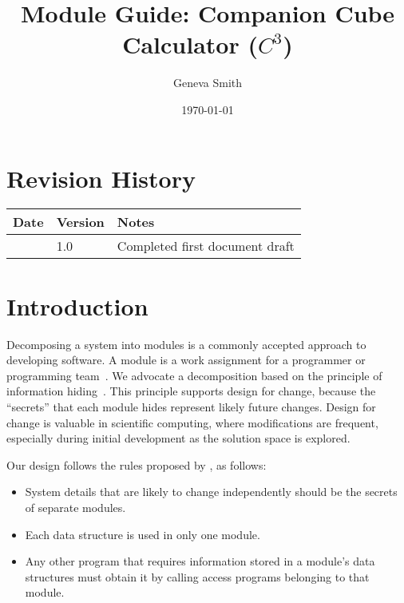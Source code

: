 \documentclass[12pt, titlepage]{article}
\newcommand{\progname}{Companion Cube Calculator} %
\newcommand{\prognameAbbrv}{$C^{3}$}
\begin{document}
\title{Module Guide: \progname{} (\prognameAbbrv{})} 
\author{Geneva Smith}
\date{\today}

\maketitle


\section{Revision History}

\begin{tabularx}{\textwidth}{p{3cm}p{2cm}X}
\toprule {\bf Date} & {\bf Version} & {\bf Notes}\\
\midrule
 & 1.0 & Completed first document draft\\
\bottomrule
\end{tabularx}

\newpage

\tableofcontents

\listoftables

\listoffigures

\newpage


\section{Introduction}

Decomposing a system into modules is a commonly accepted approach to developing
software.  A module is a work assignment for a programmer or programming
team~\citep{ParnasEtAl1984}.  We advocate a decomposition
based on the principle of information hiding~\citep{Parnas1972a}.  This
principle supports design for change, because the ``secrets'' that each module
hides represent likely future changes.  Design for change is valuable in 
scientific computing, where modifications are frequent, especially during 
initial development as the solution space is explored.  

Our design follows the rules proposed by \citet{ParnasEtAl1984}, as follows:
\begin{itemize}
\item System details that are likely to change independently should be the
  secrets of separate modules.
\item Each data structure is used in only one module.
\item Any other program that requires information stored in a module's data
  structures must obtain it by calling access programs belonging to that module.
\end{itemize}
\end{document}
